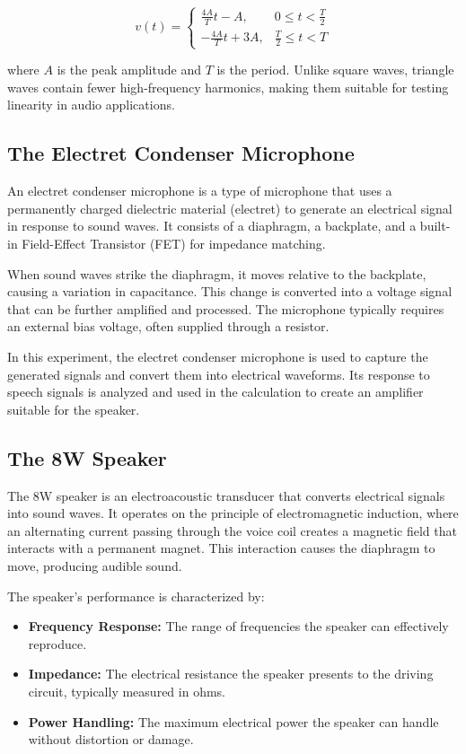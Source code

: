 \documentclass[12pt]{article}
\begin{document}
\begin{equation} v(t) = \begin{cases} \frac{4A}{T}t - A, & 0 \leq t <
              \frac{T}{2}                     \\ -\frac{4A}{T}t + 3A, & \frac{T}{2} \leq t < T\end{cases}
\end{equation}

where \( A \) is the peak amplitude and \( T \) is the period. Unlike square
waves, triangle waves contain fewer high-frequency harmonics, making them
suitable for testing linearity in audio applications.

\subsection{The Electret Condenser Microphone} An electret condenser
microphone is a type of microphone that uses a permanently charged dielectric
material (electret) to generate an electrical signal in response to sound
waves. It consists of a diaphragm, a backplate, and a built-in Field-Effect
Transistor (FET) for impedance matching.

When sound waves strike the diaphragm, it moves relative to the backplate,
causing a variation in capacitance. This change is converted into a voltage
signal that can be further amplified and processed. The microphone typically
requires an external bias voltage, often supplied through a resistor.

In this experiment, the electret condenser microphone is used to capture the
generated signals and convert them into electrical waveforms. Its response to
speech signals is analyzed and used in the calculation to create an amplifier
suitable for the speaker.

\subsection{The 8W Speaker}
The 8W speaker is an electroacoustic transducer
that converts electrical signals into sound waves. It operates on the
principle of electromagnetic induction, where an alternating current passing
through the voice coil creates a magnetic field that interacts with a
permanent magnet. This interaction causes the diaphragm to move, producing
audible sound.

The speaker’s performance is characterized by: \begin{itemize} \item
	      \textbf{Frequency Response:} The range of frequencies the speaker can
	      effectively reproduce.
	\item \textbf{Impedance:} The electrical resistance
	      the speaker presents to the driving circuit, typically measured in ohms.
	\item \textbf{Power Handling:} The maximum electrical power the speaker can
	      handle without distortion or damage. \end{itemize}
\end{document}
